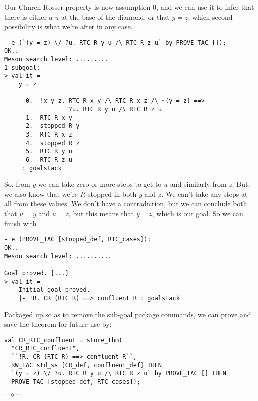 \documentclass[12pt]{article}
\newcommand{\eos}{\hfill{}$\cdots\diamond\cdots$\hfill{}\vspace{5mm}}
\begin{document}
    Our Church-Rosser property is now assumption 0, and we can use it
    to infer that there is either a $u$ at the base of the diamond, or
    that $y = z$, which second possibility is what we're after in any
    case.
\begin{session}\begin{verbatim}
- e (`(y = z) \/ ?u. RTC R y u /\ RTC R z u` by PROVE_TAC []);
OK..
Meson search level: .........
1 subgoal:
> val it =
    y = z
    ------------------------------------
      0.  !x y z. RTC R x y /\ RTC R x z /\ ~(y = z) ==>
                  ?u. RTC R y u /\ RTC R z u
      1.  RTC R x y
      2.  stopped R y
      3.  RTC R x z
      4.  stopped R z
      5.  RTC R y u
      6.  RTC R z u
     : goalstack
\end{verbatim}\end{session}
So, from $y$ we can take zero or more steps to get to $u$ and
similarly from $z$.  But, we also know that we're $R$-stopped in both
$y$ and $z$.  We can't take any steps at all from these values.  We
don't have a contradiction, but we can conclude both that $u = y$ and
$u = z$, but this means that $y = z$, which is our goal.  So we can
finish with
\begin{session}\begin{verbatim}
- e (PROVE_TAC [stopped_def, RTC_cases]);
OK..
Meson search level: ..........

Goal proved. [...]
> val it =
    Initial goal proved.
    |- !R. CR (RTC R) ==> confluent R : goalstack
\end{verbatim}\end{session}
Packaged up so as to remove the sub-goal package commands, we can
prove and save the theorem for future use by:
\begin{session}\begin{verbatim}
val CR_RTC_confluent = store_thm(
  "CR_RTC_confluent",
  ``!R. CR (RTC R) ==> confluent R``,
  RW_TAC std_ss [CR_def, confluent_def] THEN
  `(y = z) \/ ?u. RTC R y u /\ RTC R z u` by PROVE_TAC [] THEN
  PROVE_TAC [stopped_def, RTC_cases]);
\end{verbatim}\end{session}
\eos{}
\end{document}
